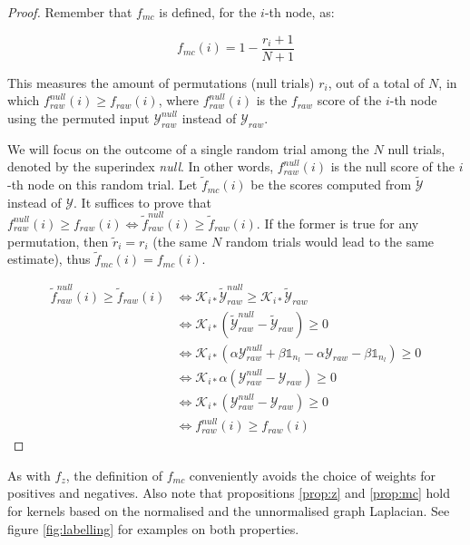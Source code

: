 \documentclass[12pt]{article}  %
\begin{document}
\begin{proof}

Remember that $f_{mc}$ is defined, for the $i$-th node, as:

$$ f_{mc}(i) = 1 - \frac{r_i + 1}{N + 1} $$

This measures the amount of permutations (null trials) $r_i$, out of a total of $N$, in which $f_{raw}^{null}(i) \geq f_{raw}(i)$, where $f_{raw}^{null}(i)$ is the $f_{raw}$ score of the $i$-th node using the permuted input $\mathcal{Y}_{raw}^{null}$ instead of $\mathcal{Y}_{raw}$. 

We will focus on the outcome of a single random trial among the $N$ null trials, denoted by the superindex \textit{null}. 
In other words, $f_{raw}^{null}(i)$ is the null score of the $i$-th node on this random trial. 
Let $\tilde{f}_{mc}(i)$ be the scores computed from $\tilde{\mathcal{Y}}$ instead of $\mathcal{Y}$. 
It suffices to prove that $ f_{raw}^{null}(i) \geq f_{raw}(i) \Leftrightarrow \tilde{f}_{raw}^{null}(i) \geq \tilde{f}_{raw}(i) $. 
If the former is true for any permutation, then $\tilde{r}_i = r_i$ (the same $N$ random trials would lead to the same estimate), thus $\tilde{f}_{mc}(i) = f_{mc}(i)$.

\begin{equation*}
\begin{split}
\tilde{f}_{raw}^{null}(i) \geq \tilde{f}_{raw}(i) &\Leftrightarrow \mathcal{K}_{i*} \tilde{\mathcal{Y}}_{raw}^{null} \geq \mathcal{K}_{i*} \tilde{\mathcal{Y}}_{raw} \\
&\Leftrightarrow \mathcal{K}_{i*} (\tilde{\mathcal{Y}}_{raw}^{null} - \tilde{\mathcal{Y}}_{raw}) \geq 0 \\
&\Leftrightarrow \mathcal{K}_{i*} (\alpha{\mathcal{Y}}_{raw}^{null} + \beta\mathbb{1}_{n_l} - \alpha{\mathcal{Y}}_{raw} - \beta\mathbb{1}_{n_l}) \geq 0 \\
&\Leftrightarrow \mathcal{K}_{i*} \alpha({\mathcal{Y}}_{raw}^{null} - {\mathcal{Y}}_{raw}) \geq 0 \\
&\Leftrightarrow \mathcal{K}_{i*} ({\mathcal{Y}}_{raw}^{null} - {\mathcal{Y}}_{raw}) \geq 0 \\
&\Leftrightarrow {f}_{raw}^{null}(i) \geq {f}_{raw}(i)
\end{split}
\end{equation*}

\end{proof}

As with $f_z$, the definition of $f_{mc}$ conveniently avoids the choice of weights for positives and negatives. 
Also note that propositions \ref{prop:z} and \ref{prop:mc} hold for kernels based on the normalised and the unnormalised graph Laplacian. 
See figure \ref{fig:labelling} for examples on both properties.
\end{document}
